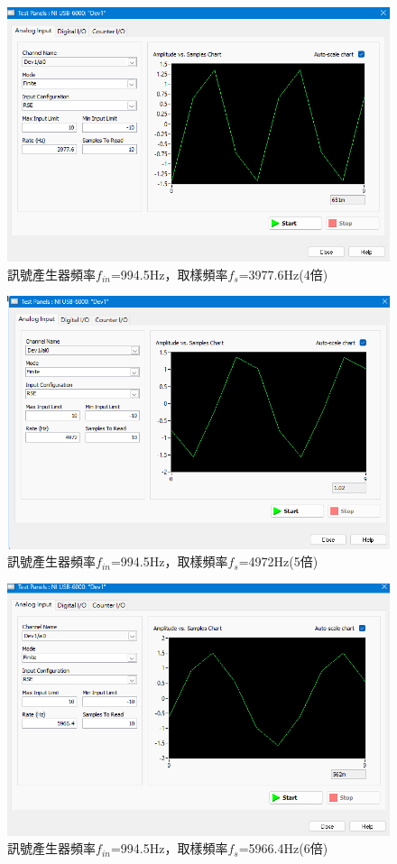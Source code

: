 \documentclass[12pt,a4paper]{article}
\begin{document}
\begin{CJK}{UTF8}{bkai}
\begin{figure}[h]
    \centering
    \includegraphics[width=0.7\linewidth]{figures/exp_4_4_3.png}
    \caption{訊號產生器頻率$f_{in}$=994.5Hz，取樣頻率$f_{s}$=3977.6Hz(4倍)}
    \label{fig:exp_4_4_3}
\end{figure}
\clearpage

\begin{figure}[h]
    \centering
    \includegraphics[width=0.7\linewidth]{figures/exp_4_4_4.png}
    \caption{訊號產生器頻率$f_{in}$=994.5Hz，取樣頻率$f_{s}$=4972Hz(5倍)}
    \label{fig:exp_4_4_4}
\end{figure}

\begin{figure}[h]
    \centering
    \includegraphics[width=0.7\linewidth]{figures/exp_4_4_5.png}
    \caption{訊號產生器頻率$f_{in}$=994.5Hz，取樣頻率$f_{s}$=5966.4Hz(6倍)}
    \label{fig:exp_4_4_5}
\end{figure}
\clearpage


\end{CJK}
\end{document}
